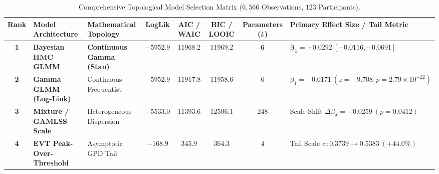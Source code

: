 \documentclass[11pt,twoside,a4paper]{article}
\begin{document}
\begin{table}[H]
\centering
\caption{Comprehensive Topological Model Selection Matrix ($6,566$ Observations, $123$ Participants).}
\label{tab:selection_matrix}
\vspace{0.4em}
\begin{adjustbox}{width=\textwidth,center}
\begin{tabular}{c l l c c c c l}
\toprule
\textbf{Rank} & \textbf{Model Architecture} & \textbf{Mathematical Topology} & \textbf{LogLik} & \textbf{AIC / WAIC} & \textbf{BIC / LOOIC} & \textbf{Parameters ($k$)} & \textbf{Primary Effect Size / Tail Metric} \\
\midrule
\textbf{1} & \textbf{Bayesian HMC GLMM} & \textbf{Continuous Gamma (Stan)} & $\mathbf{-5952.9}$ & $\mathbf{11968.2}$ & $\mathbf{11969.2}$ & $\mathbf{6}$ & $\mathbf{\beta_1 = +0.0292 \ [-0.0116, +0.0691]}$ \\
\textbf{2} & \textbf{Gamma GLMM (Log-Link)} & Continuous Frequentist & $-5952.9$ & $11917.8$ & $11958.6$ & $6$ & $\beta_1 = +0.0171 \ (z = +9.708, p = 2.79 \times 10^{-22})$ \\
\textbf{3} & \textbf{Mixture / GAMLSS Scale} & Heterogeneous Dispersion & $-5533.0$ & $11393.6$ & $12506.1$ & $248$ & Scale Shift $\Delta \beta_\sigma = +0.0259 \ (p = 0.0412)$ \\
\textbf{4} & \textbf{EVT Peak-Over-Threshold} & Asymptotic GPD Tail & $-168.9$ & $345.9$ & $364.3$ & $4$ & Tail Scale $\sigma: 0.3739 \to 0.5383 \ (+44.0\%)$ \\
\bottomrule
\end{tabular}
\end{adjustbox}
\end{table}

\vspace{0.5em}
\end{document}
